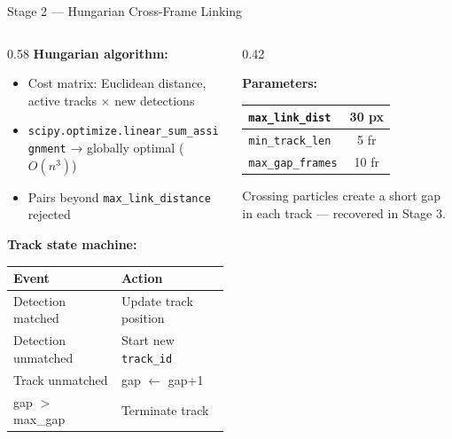 \begin{frame}{Stage 2 — Hungarian Cross-Frame Linking}
\begin{columns}
\begin{column}{0.58\textwidth}
\textbf{Hungarian algorithm:}
\begin{itemize}\small
    \item Cost matrix: Euclidean distance, active tracks $\times$ new detections
    \item \texttt{scipy.optimize.linear\_sum\_assignment} → globally optimal ($O(n^3)$)
    \item Pairs beyond \texttt{max\_link\_distance} rejected
\end{itemize}
\smallskip
\textbf{Track state machine:}\\[0.2cm]
\small\begin{tabular}{|l|l|}
\hline
\textbf{Event} & \textbf{Action} \\
\hline
Detection matched  & Update track position \\
\hline
Detection unmatched & Start new \texttt{track\_id} \\
\hline
Track unmatched     & gap $\leftarrow$ gap+1 \\
\hline
gap $>$ max\_gap    & Terminate track \\
\hline
\end{tabular}
\end{column}
\begin{column}{0.42\textwidth}
\begin{center}
\small\textbf{Parameters:}\\[0.2cm]
\begin{tabular}{|l|c|}
\hline
\texttt{max\_link\_dist} & 30 px \\
\hline
\texttt{min\_track\_len} & 5 fr \\
\hline
\texttt{max\_gap\_frames} & 10 fr \\
\hline
\end{tabular}
\end{center}
\smallskip
\begin{mynote}
\small Crossing particles create a short gap in each track — recovered in Stage 3.
\end{mynote}
\end{column}
\end{columns}
\end{frame}


